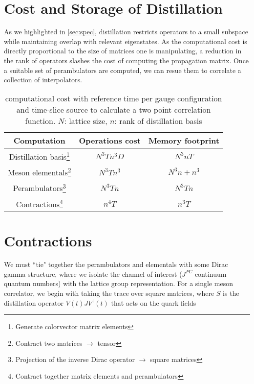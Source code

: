 \section{Cost and Storage of Distillation}
      As we highlighted in \cref{sec:spec}, distillation restricts operators to a small subspace while maintaining overlap with relevant eigenstates. As the computational cost is directly proportional to the size of matrices one is manipulating, a reduction in the rank of operators slashes the cost of computing the propagation matrix. Once a suitable set of perambulators are computed, we can resue them to correlate a collection of interpolators.
      \vspace{1em}
        \begin{table}[H]
        \begin{minipage}{16cm}
        \hspace*{2em}\begin{tabular}{ccc}
        Computation    & Operations cost & Memory footprint \\ \hline
        Distillation basis\footnote{Generate colorvector matrix elements}& $N^3Tn^3D$         & $N^3nT$      \\
        Meson elementals\footnote{Contract two matrices $\to$ tensor} & $N^3Tn^3$      & $N^3n + n^3$  \\
        Perambulators\footnote{Projection of the inverse Dirac operator $\to$ square matrices} & $N^3Tn$   & $N^3Tn$            \\
        Contractions\footnote{Contract together matrix elements and perambulators}   & $n^4T$    & $n^{3}T$   
        \end{tabular}
        \end{minipage}
        \caption{computational cost with reference time per gauge configuration and time-slice source to calculate a two point correlation function. $N$: lattice size, $n$: rank of distillation basis}
      \end{table}

  \section{Contractions}
  We must ``tie" together the perambulators and elementals with some Dirac gamma structure, where we isolate the channel of interest ($J^{PC}$ continuum quantum numbers) with the lattice group representation. For a single meson correlator, we begin with taking the trace over square matrices, where $S$ is the distillation operator $V(t)JV^{\dagger}(t)$ \cite{Neuendorf:2024ekv} that acts on the quark fields
  \\ 

